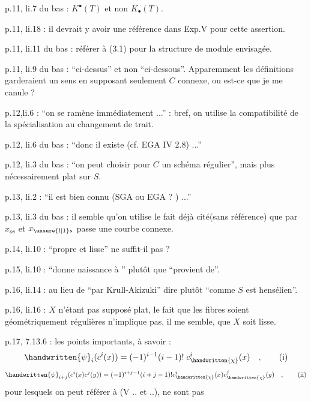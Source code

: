 
p.11, li.7 du bas : $K^{\bullet}(T)$ et non $K_{\bullet}(T)$.

p.11, li.18 : il devrait y avoir une référence dans Exp.V pour cette assertion.

p.11, li.11 du bas : référer à (3.1) pour la structure de module envisagée.

p.11, li.9 du bas : ``ci-dessus'' et non ``ci-dessous''. Apparemment les définitions garderaient un sens en supposant seulement $C$ connexe, ou est-ce que je me canule ?

p.12,li.6 : ``on se ramène immédiatement ...'' : bref, on utilise la compatibilité de la spécialisation au changement de trait.

p.12, li.6 du bas : ``donc il existe (cf. EGA IV 2.8) ...''

p.12, li.3 du bas : ``on peut choisir pour $C$ un schéma régulier'', mais plus nécessairement plat sur $S$.

p.13, li.2 : ``il est bien connu (SGA ou EGA ? ) ...''


p.13, li.3 du bas : il semble qu'on utilise le fait déjà cité(sans référence) que par $x_{os}$ et $x_{\unsure{l|1}s}$ passe une courbe connexe.

p.14, li.10 : ``propre et lisse'' ne suffit-il pas ?

p.15, li.10 : ``donne naissance à '' plutôt que ``provient de''.

p.16, li.14 : au lieu de ``par Krull-Akizuki'' dire plutôt ``comme $S$ est hensélien''.

p.16, li.16 : $X$ n'étant pas supposé plat, le fait que les fibres soient géométriquement régulières n'implique pas, il me semble, que $X$ soit lisse.


p.17, 7.13.6 : les points importants, à savoir :
\begingroup
\makeatletter\tagsleft@true\makeatother
\[
\handwritten{\psi}_i(c^i(x)) = (-1)^{i-1}(i-1)!\;c^i_{\handwritten{\chi}}(x)\quad,\tag*{(i)}
\]
\[
\handwritten{\psi}_{i+j}(c^i(x)c^j(y)) = (-1)^{i+j-1}(i+j-1)!c^i_{\handwritten{\chi}}(x)c^j_{\handwritten{\chi}}(y)\quad,\tag*{(ii)}
\]
\endgroup
pour lesquels on peut référer à (V .. et ..), ne sont pas
